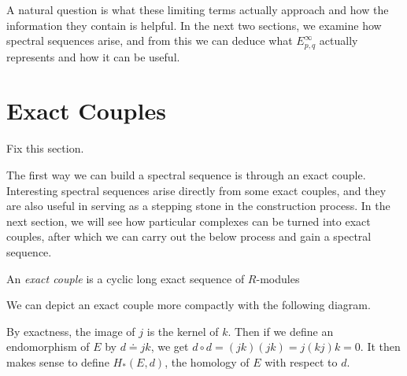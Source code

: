 \documentclass[twoside,10pt]{article}
\begin{document}
A natural question is what these limiting terms actually approach and how the information they contain is helpful. In the next two sections, we examine how spectral sequences arise, and from this we can deduce what $E_{p,q}^{\infty}$ actually represents and how it can be useful.


\section{Exact Couples}

{\color{red}Fix this section.}

The first way we can build a spectral sequence is through an exact couple. Interesting spectral sequences arise directly from some exact couples, and they are also useful in serving as a stepping stone in the construction process. In the next section, we will see how particular complexes can be turned into exact couples, after which we can carry out the below process and gain a spectral sequence.

\begin{defn}[]
	An \textit{exact couple} is a cyclic long exact sequence of $R$-modules
	\begin{center}
	\end{center}
\end{defn}

We can depict an exact couple more compactly with the following diagram.
\begin{center}
\end{center}

By exactness, the image of $j$ is the kernel of $ k$. Then if we define an endomorphism of $E$ by $d \doteq jk$, we get $d \circ d = (jk)(jk) = j(kj)k = 0$. It then makes sense to define $H_*(E,d)$, the homology of $E$ with respect to $d$.
\end{document}
